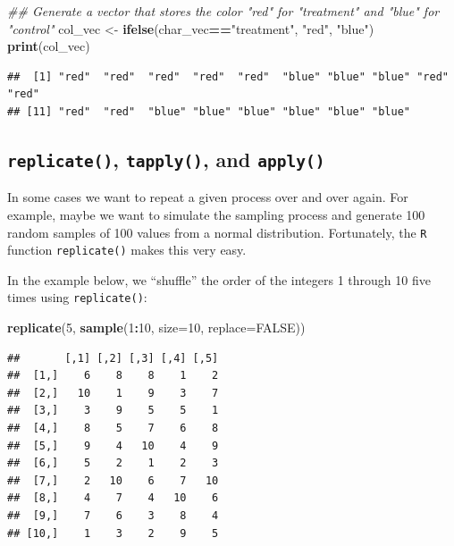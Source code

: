 \documentclass[]{book}
\newenvironment{Shaded}{\begin{snugshade}}{\end{snugshade}}
\newcommand{\CommentTok}[1]{\textcolor[rgb]{0.56,0.35,0.01}{\textit{#1}}}
\newcommand{\DataTypeTok}[1]{\textcolor[rgb]{0.13,0.29,0.53}{#1}}
\newcommand{\DecValTok}[1]{\textcolor[rgb]{0.00,0.00,0.81}{#1}}
\newcommand{\KeywordTok}[1]{\textcolor[rgb]{0.13,0.29,0.53}{\textbf{#1}}}
\newcommand{\NormalTok}[1]{#1}
\newcommand{\OperatorTok}[1]{\textcolor[rgb]{0.81,0.36,0.00}{\textbf{#1}}}
\newcommand{\OtherTok}[1]{\textcolor[rgb]{0.56,0.35,0.01}{#1}}
\newcommand{\StringTok}[1]{\textcolor[rgb]{0.31,0.60,0.02}{#1}}
\begin{document}
\begin{Shaded}
\begin{Highlighting}[]
\CommentTok{## Generate a vector that stores the color "red" for "treatment" and "blue" for "control"}
\NormalTok{col_vec <-}\StringTok{ }\KeywordTok{ifelse}\NormalTok{(char_vec}\OperatorTok{==}\StringTok{"treatment"}\NormalTok{, }\StringTok{"red"}\NormalTok{, }\StringTok{"blue"}\NormalTok{)}
\KeywordTok{print}\NormalTok{(col_vec)}
\end{Highlighting}
\end{Shaded}

\begin{verbatim}
##  [1] "red"  "red"  "red"  "red"  "red"  "blue" "blue" "blue" "red"  "red" 
## [11] "red"  "red"  "blue" "blue" "blue" "blue" "blue" "blue"
\end{verbatim}

\hypertarget{replicate-tapply-and-apply}{%
\subsection{\texorpdfstring{\texttt{replicate()}, \texttt{tapply()}, and \texttt{apply()}}{replicate(), tapply(), and apply()}}\label{replicate-tapply-and-apply}}

In some cases we want to repeat a given process over and over again. For example, maybe we want to simulate the sampling process and generate 100 random samples of 100 values from a normal distribution. Fortunately, the \texttt{R} function \texttt{replicate()} makes this very easy.

In the example below, we ``shuffle'' the order of the integers 1 through 10 five times using \texttt{replicate()}:

\begin{Shaded}
\begin{Highlighting}[]
\KeywordTok{replicate}\NormalTok{(}\DecValTok{5}\NormalTok{, }\KeywordTok{sample}\NormalTok{(}\DecValTok{1}\OperatorTok{:}\DecValTok{10}\NormalTok{, }\DataTypeTok{size=}\DecValTok{10}\NormalTok{, }\DataTypeTok{replace=}\OtherTok{FALSE}\NormalTok{))}
\end{Highlighting}
\end{Shaded}

\begin{verbatim}
##       [,1] [,2] [,3] [,4] [,5]
##  [1,]    6    8    8    1    2
##  [2,]   10    1    9    3    7
##  [3,]    3    9    5    5    1
##  [4,]    8    5    7    6    8
##  [5,]    9    4   10    4    9
##  [6,]    5    2    1    2    3
##  [7,]    2   10    6    7   10
##  [8,]    4    7    4   10    6
##  [9,]    7    6    3    8    4
## [10,]    1    3    2    9    5
\end{verbatim}
\end{document}
